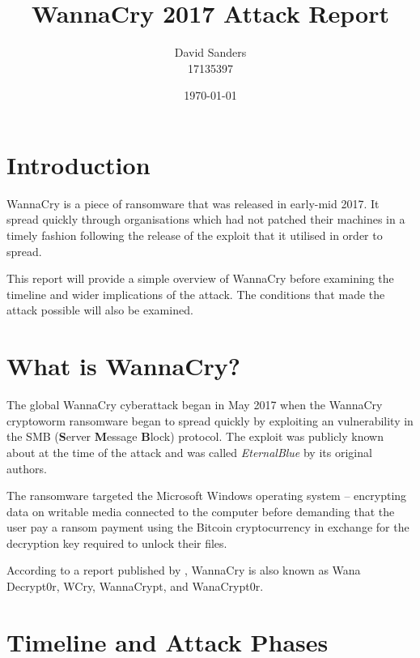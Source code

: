 \documentclass[12pt]{article}
\title{WannaCry 2017 Attack Report}
\author{David Sanders\\17135397}
\date{\today}
\begin{document}
\maketitle


\section{Introduction}
WannaCry is a piece of ransomware that was released in early-mid 2017. It spread quickly through organisations which had not patched their machines in a timely fashion following the release of the exploit that it utilised in order to spread.

This report will provide a simple overview of WannaCry before examining the timeline and wider implications of the attack. The conditions that made the attack possible will also be examined.


\section{What is WannaCry?}
The global WannaCry cyberattack began in May 2017 when the WannaCry cryptoworm ransomware began to spread quickly by exploiting an vulnerability in the SMB (\textbf{S}erver \textbf{M}essage \textbf{B}lock) protocol. The exploit was publicly known about at the time of the attack and was called \textit{EternalBlue} by its original authors.

The ransomware targeted the Microsoft Windows operating system -- encrypting data on writable media connected to the computer before demanding that the user pay a ransom payment using the Bitcoin cryptocurrency in exchange for the decryption key required to unlock their files.

According to a report published by \citet[May 15\textsuperscript{th}]{pdf:CERT-LT:WannaCry-Ransomware-Report-v1.0:20170615}, WannaCry is also known as Wana Decrypt0r, WCry, WannaCrypt, and WanaCrypt0r.


\section{Timeline and Attack Phases}
\end{document}
